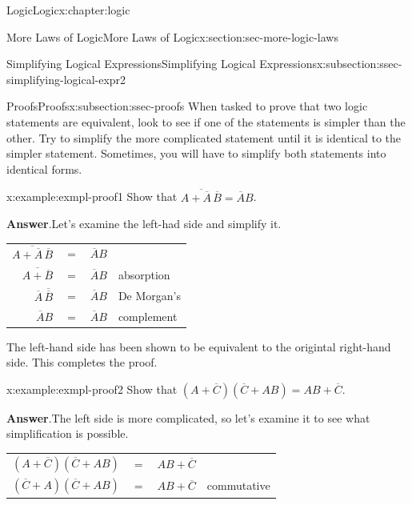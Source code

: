 \documentclass[twoside,10pt,]{book}
\newcommand{\blocktitlefont}{\relax}
\newcommand{\tabularfont}{\relax}
\numberwithin{equation}{section}
\begin{document}
\begin{chapterptx}{Logic}{}{Logic}{}{}{x:chapter:logic}
\begin{sectionptx}{More Laws of Logic}{}{More Laws of Logic}{}{}{x:section:sec-more-logic-laws}
\begin{subsectionptx}{Simplifying Logical Expressions}{}{Simplifying Logical Expressions}{}{}{x:subsection:ssec-simplifying-logical-expr2}
\end{subsectionptx}
%
%
\typeout{************************************************}
\typeout{************************************************}
%
\begin{subsectionptx}{Proofs}{}{Proofs}{}{}{x:subsection:ssec-proofs}
%
%
%
When tasked to prove that two logic statements are equivalent, look to see if one of the statements is simpler than the other.  Try to simplify the more complicated statement until it is identical to the simpler statement.  Sometimes, you will have to simplify both statements into identical forms.%
\begin{example}{}{x:example:exmpl-proof1}%
Show that \(\overline{A+\overline{A}\,\overline{B}}=\overline{A}B\).\par\smallskip%
\noindent\textbf{\blocktitlefont Answer}.\label{g:answer:idp228901480}{}\hypertarget{g:answer:idp228901480}{}\quad{}Let's examine the left-had side and simplify it. \begin{center}%
{\tabularfont%
\begin{tabular}{llll}
\multicolumn{1}{r}{\(\overline{A+\overline{A}\,\overline{B}}\)}&\(=\)&\(\overline{A}B\)&\tabularnewline[0pt]
\multicolumn{1}{r}{\(\overline{A+\overline{B}}\)}&\(=\)&\(\overline{A}B\)&absorption\tabularnewline[0pt]
\multicolumn{1}{r}{\(\overline{A}\,\overline{\overline{B}}\)}&\(=\)&\(\overline{A}B\)&De Morgan's\tabularnewline[0pt]
\multicolumn{1}{r}{\(\overline{A}B\)}&\(=\)&\(\overline{A}B\)&complement
\end{tabular}
}%
\end{center}%
The left-hand side has been shown to be equivalent to the origintal right-hand side.  This completes the proof.%
\end{example}
\begin{example}{}{x:example:exmpl-proof2}%
Show that \((A+\overline{C})(\overline{C}+AB)=AB+\overline{C}\).\par\smallskip%
\noindent\textbf{\blocktitlefont Answer}.\label{g:answer:idp228913256}{}\hypertarget{g:answer:idp228913256}{}\quad{}The left side is more complicated, so let's examine it to see what simplification is possible. \begin{center}%
{\tabularfont%
\begin{tabular}{llll}
\multicolumn{1}{r}{\((A+\overline{C})(\overline{C}+AB)\)}&\(=\)&\(AB+\overline{C}\)&\tabularnewline[0pt]
\multicolumn{1}{r}{\((\overline{C}+A)(\overline{C}+AB)\)}&\(=\)&\(AB+\overline{C}\)&commutative\tabularnewline[0pt]

\end{tabular}}
\end{center}
\end{example}
\end{subsectionptx}
\end{sectionptx}
\end{chapterptx}
\end{document}
